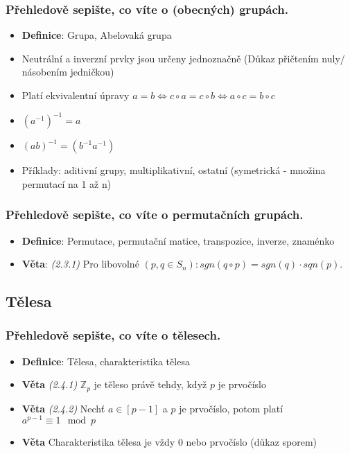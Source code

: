 \documentclass[10pt,a4paper]{article}
\begin{document}
{\subsubsection{Přehledově sepište, co víte o (obecných) grupách.}

\begin{itemize}[label=$\circ$]
    \item \textbf{Definice}: Grupa, Abelovaká grupa
\item Neutrální a inverzní prvky jsou určeny jednoznačně (Důkaz přičtením nuly/ násobením jedničkou)
\item Platí ekvivalentní úpravy $a = b \iff c \circ a = c \circ b \iff a \circ c = b \circ c$
\item $(a^{-1})^{-1} = a$
\item $(ab)^{-1} = (b^{-1}a^{-1})$ 
\item Příklady: aditivní grupy, multiplikativní, ostatní (symetrická - množina permutací na 1 až n)

\end{itemize}

\subsubsection{Přehledově sepište, co víte o permutačních grupách.}

\begin{itemize}[label=$\circ$]
    \item \textbf{Definice}: Permutace, permutační matice, transpozice, inverze, znaménko
    \item \textbf{Věta}: \textit{(2.3.1)} Pro libovolné $(p, q \in S_n): sgn(q \circ p) = sgn(q) \cdot sqn(p)$.

\end{itemize}

\subsection{Tělesa}
\subsubsection{Přehledově sepište, co víte o tělesech.}

\begin{itemize}[label=$\circ$]
    \item \textbf{Definice}: Tělesa, charakteristika tělesa
    \item \textbf{Věta} \textit{(2.4.1)} $\mathbb{Z}_p$ je těleso právě tehdy, když $p$ je prvočíslo
    \item \textbf{Věta} \textit{(2.4.2)} Nechť $a \in [p-1]$ a $p$ je prvočíslo, potom platí $a^{p-1} \equiv 1 \mod p$
    \item \textbf{Věta} Charakteristika tělesa je vždy 0 nebo prvočíslo (důkaz sporem)


\end{itemize}}
\end{document}
